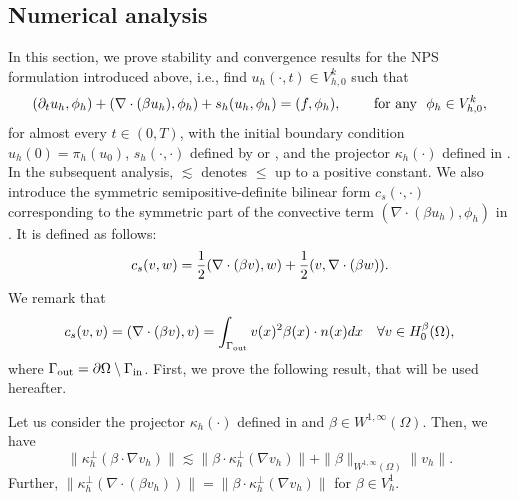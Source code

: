 \subsection{Numerical analysis} In this section, we prove stability and convergence results for the NPS formulation introduced above, i.e., find $u_h(\cdot,t) \in V^k_{h,0}$ such that  
\begin{equation}\label{eq-SZstab}
(\partial_t u_h,\phi_h) +   (\nabla \cdot (\beta u_h),\phi_h) + s_h(u_h,\phi_h)=  (f , \phi_h ) , \qquad \hbox{ for any }  \ \phi_h \in V^k_{h,0}, 
\end{equation}
for almost every $t \in (0,T)$, with the initial boundary condition $u_h(0) = \pi_h(u_0)$, $s_h (\cdot,\cdot) $ defined by  or , and the projector $\kappa_h (\cdot) $ defined in .  In the subsequent analysis, $\lesssim$ denotes $\leq$ up to a positive constant. We also introduce the symmetric semipositive-definite bilinear form $c_s(\cdot,\cdot)$ corresponding to the symmetric part of the convective term $(\nabla \cdot (\beta u_h),\phi_h)$ in . It is defined as follows:
$$ c_s(v,w)=\frac{1}{2}(\nabla \cdot  (\beta v),w)+\frac{1}{2} ( v,\nabla \cdot (\beta w)).$$ 
We remark that 
\begin{align}\label{eq-csym}
c_s(v,v) = (\nabla \cdot (\beta v),v) = \int_{\Gamma_{\rm out}} v(x)^2 \beta(x) \cdot n(x) dx \quad \forall v \in H^\beta_0(\Omega),
\end{align}
 where $\Gamma_{\rm out} = \partial \Omega \setminus \Gamma_{\rm in}$. First, we prove the following result, that will be used hereafter.
\begin{lemma}
\label{lem-kappastab}
Let us consider the projector $\kappa_h(\cdot)$ defined in  and $\beta \in W^{1,\infty}(\Omega)$. Then, we have
$$
 \|\kappa_h^\perp(\beta \cdot \nabla v_h)\| \lesssim  \| \beta \cdot \kappa_h^\perp(\nabla v_h) \| + 
 \|\beta\|_{W^{1,\infty}(\Omega)} \|v_h\|.
$$
Further, $ \|\kappa_h^\perp(\nabla \cdot (\beta v_h))\| = \| \beta \cdot \kappa_h^\perp(\nabla v_h) \|$ for $\beta \in V_h^1$.
\end{lemma}

